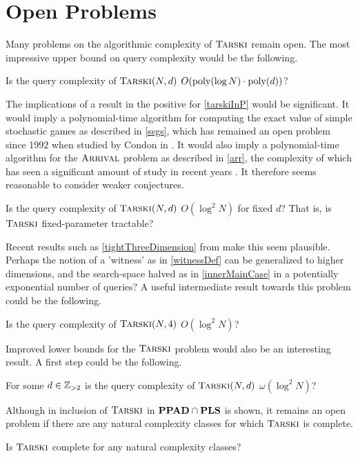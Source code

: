 \section{Open Problems}
Many problems on the algorithmic complexity of $\textsc{Tarski}$ remain 
open. The most impressive upper bound on query complexity would be the following.
\begin{open} \label{tarskiInP}
  Is the query complexity of $\textsc{Tarski}(N, d)$ $O(\mathrm{poly}(\log N) \cdot \mathrm{poly}(d))$?
\end{open}
The implications of a result in the positive for \cref{tarskiInP} would be significant. 
It would imply a polynomial-time algorithm for
computing the exact value of simple stochastic games as described in \cref{ssgs},
which has remained an open problem since 1992 when studied by Condon in \citep{condon}.
It would also imply a polynomial-time algorithm for the $\textsc{Arrival}$ problem as described in \cref{arr},
the complexity of which has seen a significant amount of study in recent years
\citep{gärtner2021subexponential, gärtner2018arrival, arrivalBasic, arrLowerBound}. It therefore seems reasonable to consider weaker conjectures.
\begin{open} \label{tarskiFixedParameterTractable}
  Is the query complexity of 
  $\textsc{Tarski}(N, d)$ $O(\log^2 N)$ for fixed $d$? That is, is $\textsc{Tarski}$ fixed-parameter tractable?
\end{open}
Recent results such as \cref{tightThreeDimension} from \citep{fasterTarski} make this seem
plausible. Perhaps the notion of a 'witness' as in \cref{witnessDef} can be
generalized to higher dimensions, and the search-space halved as in \cref{innerMainCase}
in a potentially exponential number of queries? A useful intermediate result towards this problem could be
the following.
\begin{open} \label{tightFourDimension}
  Is the query complexity of $\textsc{Tarski}(N, 4)$ $O(\log^2 N)$?
\end{open}
Improved lower bounds for the $\textsc{Tarski}$ problem would also be an interesting
result. A first step could be the following.
\begin{open} \label{improvedLowerBound}
  For some $d \in \mathbb{Z}_{> 2}$ is the query complexity of
  $\textsc{Tarski}(N, d)$ $\omega(\log^2 N)$?
\end{open}
Although in \citep{lowerBound} inclusion of $\textsc{Tarski}$ in $\mathbf{PPAD} \cap \mathbf{PLS}$ is shown,
it remains an open problem if there are any natural complexity classes for which $\textsc{Tarski}$ is
complete.
\begin{open} \label{complete}
  Is $\textsc{Tarski}$ complete for any natural complexity classes?
\end{open}
